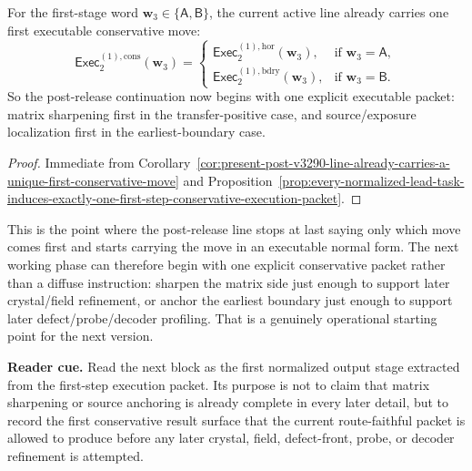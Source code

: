 \begin{corollary}
\label{cor:present-post-v3290-line-already-carries-a-first-executable-conservative-move}
For the first-stage word \(\mathbf w_3\in\{\mathsf A,\mathsf B\}\), the current active line already carries one first executable conservative move:
\[
 \mathsf{Exec}^{(1),\mathrm{cons}}_{2}(\mathbf w_3)
 =
 \begin{cases}
 \mathsf{Exec}^{(1),\mathrm{hor}}_{2}(\mathbf w_3), & \text{if }\mathbf w_3=\mathsf A,\\[2mm]
 \mathsf{Exec}^{(1),\mathrm{bdry}}_{2}(\mathbf w_3), & \text{if }\mathbf w_3=\mathsf B.
 \end{cases}
\]
So the post-release continuation now begins with one explicit executable packet: matrix sharpening first in the transfer-positive case, and source/exposure localization first in the earliest-boundary case.
\end{corollary}

\begin{proof}
Immediate from Corollary~\ref{cor:present-post-v3290-line-already-carries-a-unique-first-conservative-move} and Proposition~\ref{prop:every-normalized-lead-task-induces-exactly-one-first-step-conservative-execution-packet}.
\end{proof}

\begin{remark}
\label{rem:what-this-first-executable-packet-now-buys}
This is the point where the post-release line stops at last saying only which move comes first and starts carrying the move in an executable normal form. The next working phase can therefore begin with one explicit conservative packet rather than a diffuse instruction: sharpen the matrix side just enough to support later crystal/field refinement, or anchor the earliest boundary just enough to support later defect/probe/decoder profiling. That is a genuinely operational starting point for the next version.
\end{remark}


\noindent\textbf{Reader cue.} Read the next block as the first normalized output stage extracted from the first-step execution packet. Its purpose is not to claim that matrix sharpening or source anchoring is already complete in every later detail, but to record the first conservative result surface that the current route-faithful packet is allowed to produce before any later crystal, field, defect-front, probe, or decoder refinement is attempted.


